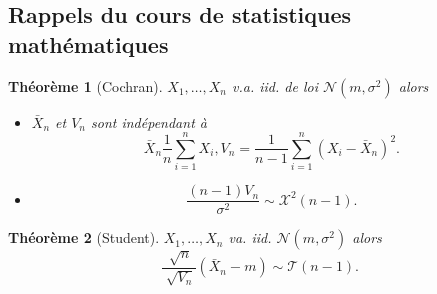 \documentclass{article}
\theoremstyle{plain}%
\newtheorem{thm}{Théorème}[section]
\theoremstyle{definition}
\theoremstyle{remark}
\begin{document}
\subsection{Rappels du cours de statistiques mathématiques}

\begin{thm}[Cochran]
    $ X_1, \dots, X_n $ v.a. iid. de loi $ \mathcal{N}(m, \sigma^2) $ alors 
    \begin{itemize}
        \item $ \bar{X}_n $  et $ V_n $ sont indépendant à 
        \[
            \bar{X}_n \frac{1}{n}\sum_{i=1}^{n}X_i , V_n = \frac{1}{n-1}\sum_{i=1}^{n}(X_i - \bar{X}_n)^2
        .\]
        \item 
        \[
            \frac{(n-1) V_n}{\sigma ^2} \sim \mathcal{X}^2(n-1)
        .\]
    \end{itemize}
\end{thm}

\begin{thm}[Student]
    $ X_1, \dots, X_n $ va. iid. $ \mathcal{N}(m, \sigma ^2) $ alors 
    \[
        \frac{\sqrt[]{n}}{\sqrt[]{V_n}} (\bar{X}_n - m) \sim \mathcal{T}(n-1)
    .\]
\end{thm}
\end{document}
